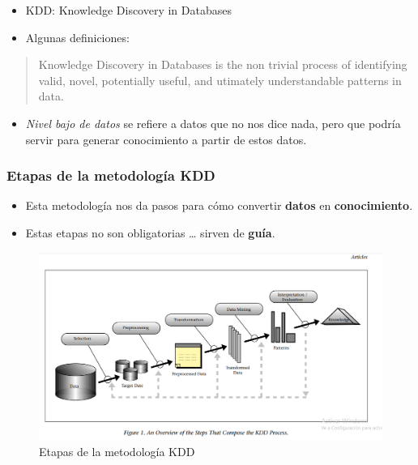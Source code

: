 \documentclass[
]{book}
\providecommand{\tightlist}{%
  \setlength{\itemsep}{0pt}\setlength{\parskip}{0pt}}
\begin{document}
\begin{itemize}
\item
  KDD: Knowledge Discovery in Databases
\item
  Algunas definiciones:
\end{itemize}

\begin{quote}
Knowledge Discovery in Databases is
the non trivial process of identifying
valid, novel, potentially useful, and
utimately understandable patterns in data.
\end{quote}

\begin{itemize}
\tightlist
\item
  \emph{Nivel bajo de datos} se refiere a datos que
  no nos dice nada, pero que podría servir para
  generar conocimiento a partir de estos datos.
\end{itemize}

\hypertarget{etapas-de-la-metodologuxeda-kdd}{%
\subsubsection{Etapas de la metodología KDD}\label{etapas-de-la-metodologuxeda-kdd}}

\begin{itemize}
\item
  Esta metodología nos da pasos para cómo
  convertir \textbf{datos} en \textbf{conocimiento}.
\item
  Estas etapas no son obligatorias \ldots{}
  sirven de \textbf{guía}.
\end{itemize}

\begin{figure}

{\centering \includegraphics[width=15.18in]{images/etapas-metodologia-kdd} 

}

\caption{Etapas de la metodología KDD}\label{fig:etapas-kdd}
\end{figure}
\end{document}
